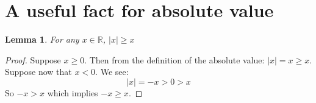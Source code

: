 \documentclass{article}
\newtheorem*{lemma}{Lemma}
\begin{document}
\section*{A useful fact for absolute value}

\begin{lemma}
	For any \(x \in \mathbb{R}\), \(|x| \geq x\)
\end{lemma}
\begin{proof}
	Suppose \(x \geq 0\). Then from the definition of the absolute value: \(|x| = x \geq x\). Suppose now that \(x < 0\). We see:
	\begin{equation*}
		|x| = -x > 0 > x
	\end{equation*}
	So \(-x > x\) which implies \(-x \geq x\).
\end{proof}
\end{document}
